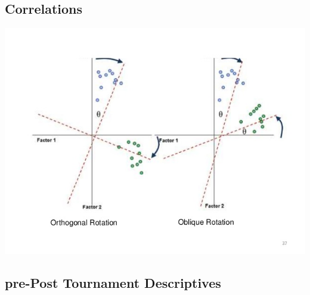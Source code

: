 \documentclass[12pt]{report}
\begin{document}
\newpage
{} %
\begin{landscape}


\subsection{Correlations}

\includegraphics[scale = .5]{../images/orthogonalObliqueRotationExample.jpg}







\clearpage




\clearpage





\clearpage
\subsection{pre-Post Tournament Descriptives}






\clearpage





\end{landscape}
\restoregeometry
\end{document}
